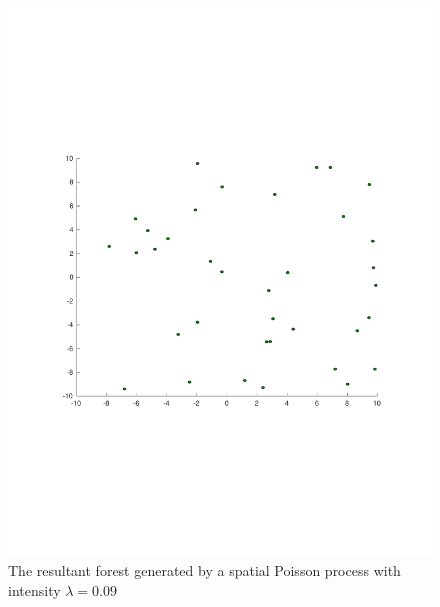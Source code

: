 \begin{figure}
  \centering
  \begin{minipage}[b]{0.4\textwidth}
    \includegraphics[width=\textwidth]{figures/experiments/poisson009}
    \caption{The resultant forest generated by a spatial Poisson process with
      intensity \(\lambda = 0.09\)}
    \label{fig:poisson009}
  \end{minipage}
  \begin{minipage}[b]{0.4\textwidth}

\end{minipage}
\end{figure}
